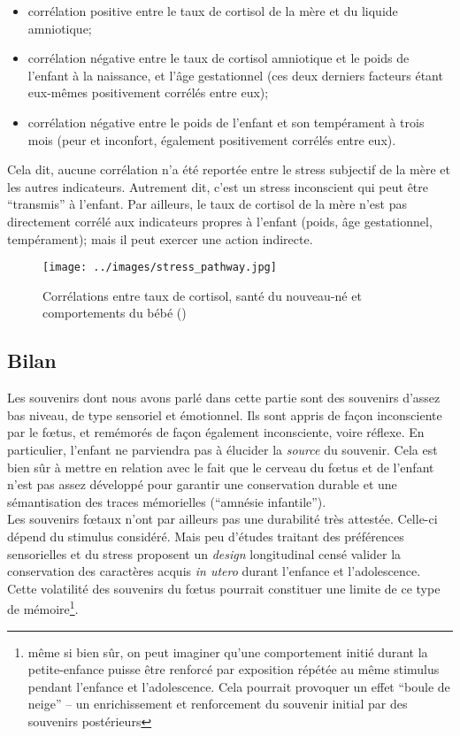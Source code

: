 \documentclass[french]{article}
\begin{document}
				\begin{itemize}
					\item corrélation positive entre le taux de cortisol de la mère et du liquide amniotique;
					\item corrélation négative entre le taux de cortisol amniotique et le poids de l'enfant à la naissance, et l'âge gestationnel (ces deux derniers facteurs étant eux-mêmes positivement corrélés entre eux);
					\item corrélation négative entre le poids de l'enfant et son tempérament à trois mois (peur et inconfort, également positivement corrélés entre eux).
				\end{itemize}\vspace{3mm}
				Cela dit, aucune corrélation n'a été reportée entre le stress subjectif de la mère et les autres indicateurs. Autrement dit, c'est un stress inconscient qui peut être ``transmis'' à l'enfant. Par ailleurs, le taux de cortisol de la mère n'est pas directement corrélé aux indicateurs propres à l'enfant (poids, âge gestationnel, tempérament); mais il peut exercer une action indirecte.
				\begin{figure}[H]
					\centering
					\texttt{[image: ../images/stress\_pathway.jpg]}
					\caption{Corrélations entre taux de cortisol, santé du nouveau-né et comportements du bébé (\cite{baibazarova2013})}
				\end{figure}
			
			\subsection{Bilan}
				Les souvenirs dont nous avons parlé dans cette partie sont des souvenirs d'assez bas niveau, de type sensoriel et émotionnel. Ils sont appris de façon inconsciente par le fœtus, et remémorés de façon également inconsciente, voire réflexe. En particulier, l'enfant ne parviendra pas à élucider la \textit{source} du souvenir. Cela est bien sûr à mettre en relation avec le fait que le cerveau du fœtus et de l'enfant n'est pas assez développé pour garantir une conservation durable et une sémantisation des traces mémorielles (``amnésie infantile'').\\
				Les souvenirs fœtaux n'ont par ailleurs pas une durabilité très attestée. Celle-ci dépend du stimulus considéré. Mais peu d'études traitant des préférences sensorielles et du stress proposent un \textit{design} longitudinal censé valider la conservation des caractères acquis \textit{in utero} durant l'enfance et l'adolescence. Cette volatilité des souvenirs du fœtus pourrait constituer une limite de ce type de mémoire\footnote{ même si bien sûr, on peut imaginer qu'une comportement initié durant la petite-enfance puisse être renforcé par exposition répétée au même stimulus pendant l'enfance et l'adolescence. Cela pourrait provoquer un effet ``boule de neige'' -- un enrichissement et renforcement du souvenir initial par des souvenirs postérieurs}.
				
\end{document}
